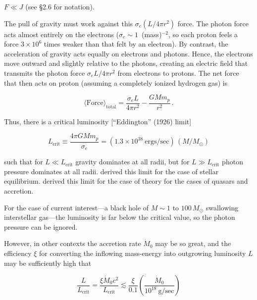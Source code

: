 \documentclass[aps,prd,twocolumn,superscriptaddress,nofootinbib]{revtex4-2}
\begin{document}
$F \ll J$ (see \S2.6 for notation).

The pull of gravity must work against this $\sigma_e^{} (L/4\pi r^2)$ force.  The photon force
acts almost entirely on the electrons ($\sigma_e \sim 1$~(mass)$^{-2}$, so each proton feels a
force $3 \times 10^6$ times weaker than that felt by an electron).  By contrast, the
acceleration of gravity acts equally on electrons and photons.  Hence, the electrons
move outward and slightly relative to the photons, creating an electric field that
transmits the photon force $\sigma_e L/4\pi r^2$ from electrons to protons.  The net force
that then acts on proton (assuming a completely ionized hydrogen gas) is

\begin{equation}
\langle\text{Force}\rangle_{\text{total}} = \frac{\sigma_e L}{4\pi r^2} - \frac{GMm_p}{r^2}\,.
\tag{4.5.3}
\end{equation}

Thus, there is a critical luminosity [``Eddington'' (1926) limit]

\begin{equation}
L_{\text{crit}} \equiv \frac{4\pi G M m_p}{\sigma_e}
= (1.3 \times 10^{38}~\text{ergs/sec})\,(M/M_\odot)
\tag{4.5.4}
\end{equation}

such that for $L \ll L_{\text{crit}}$ gravity dominates at all radii, but for $L \gg L_{\text{crit}}$ photon
pressure dominates at all radii.  \cite{Zeldovich1964} derived this limit for the case of
stellar equilibrium.  \cite{Zeldovich1964} derived this limit for the case of
theory for the cases of quasars and accretion.

For the case of current interest---a black hole of $M\sim 1$ to $100\,M_\odot$ swallowing
interstellar gas---the luminosity is far below the critical value, so the photon
pressure can be ignored.


However, in other contexts the accretion rate $\dot{M}_0$ may be so great, and the
efficiency $\xi$ for converting the inflowing mass-energy into outgrowing luminosity
$L$ may be sufficiently high that

\begin{equation}
\frac{L}{L_{\text{crit}}} = \frac{\xi \dot{M}_0 c^2}{L_{\text{crit}}}
\lesssim \frac{\xi}{0.1} \left(\frac{\dot{M}_0}{10^{18}~\text{g/sec}}\right)
\tag{4.5.5}
\end{equation}
\end{document}
